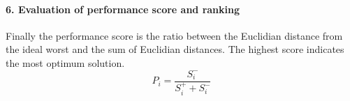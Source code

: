 \paragraph{6. Evaluation of performance score and ranking}
Finally the performance score is the ratio between the Euclidian distance from the ideal worst and the sum of Euclidian distances. The highest score indicates the most optimum solution.
\begin{equation}
    P_{i}=\frac{S_{i}^{-}}{S_{i}^{+}+S_{i}^{-}}
\end{equation}







